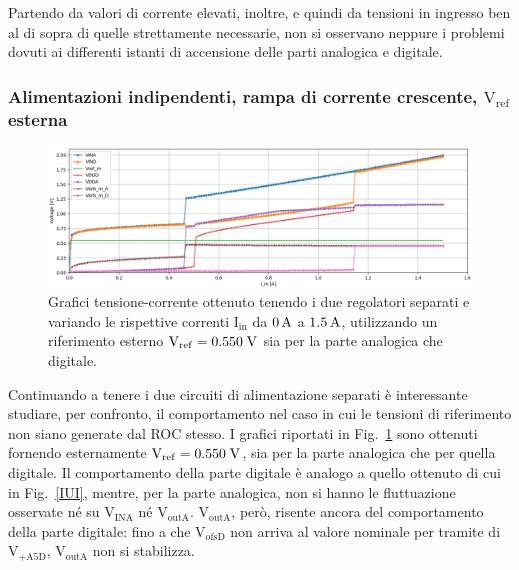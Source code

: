 Partendo da valori di corrente elevati, inoltre, e quindi da tensioni in ingresso ben al di sopra di quelle strettamente necessarie, non si osservano neppure i problemi dovuti ai differenti istanti di accensione delle parti analogica e digitale.
% 
%
%

\subsubsection{Alimentazioni indipendenti, rampa di corrente crescente, $\mathrm{V_{ref}}$ esterna} 

\begin{figure}
\centering
\includegraphics[width=\textwidth]{Immagini/IUEVref2}
\caption{Grafici tensione-corrente ottenuto tenendo i due regolatori separati e variando le rispettive correnti $\mathrm{I_{in}}$ da $0\rm \, A$ a $1.5\rm \, A$, utilizzando un riferimento esterno $\mathrm{V_{ref}}=0.550 \rm \; V$ sia per la parte analogica che digitale.}
\label{IUEVref}
\end{figure}
Continuando a tenere i due circuiti di alimentazione separati è interessante studiare, per confronto, il comportamento nel caso in cui le tensioni di riferimento non siano generate dal ROC stesso.
I grafici riportati in Fig.~\ref{IUEVref} sono ottenuti fornendo esternamente $\mathrm{V_{ref}}=0.550\rm \; V$,  sia per la parte analogica che per quella digitale.
Il comportamento della parte digitale è analogo a quello ottenuto di cui in Fig.~\ref{IUI}, mentre, per la parte analogica, non si hanno le fluttuazione osservate n\'e su $\mathrm{V_{INA}}$ n\'e $\mathrm{V_{outA}}$. $\mathrm{V_{outA}}$, però, risente ancora del comportamento della parte digitale: fino a che $\mathrm{V_{ofsD}}$ non arriva al valore nominale per tramite di $\mathrm{V_{+A5D}}$, $\mathrm{V_{outA}}$ non si stabilizza.

